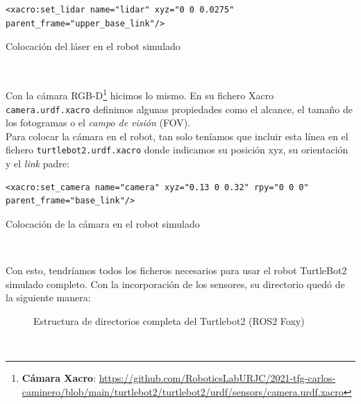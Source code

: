\begin{code}[H]
\begin{lstlisting}
<xacro:set_lidar name="lidar" xyz="0 0 0.0275" parent_frame="upper_base_link"/>
\end{lstlisting}
\caption{Colocación del láser en el robot simulado}
\label{fig:colocacion_laser_simulado}
\end{code}\

Con la cámara RGB-D\footnote{\textbf{Cámara Xacro}: \url{https://github.com/RoboticsLabURJC/2021-tfg-carlos-caminero/blob/main/turtlebot2/turtlebot2/urdf/sensors/camera.urdf.xacro}} hicimos lo mismo. En su fichero Xacro \texttt{camera.urdf.xacro} definimos algunas propiedades como el alcance, el tamaño de los fotogramas o el \textit{campo de visión} (FOV).\\

Para colocar la cámara en el robot, tan solo teníamos que incluir esta línea en el fichero \texttt{turtlebot2.urdf.xacro} donde indicamos su posición xyz, su orientación y el \textit{link} padre:\\

\begin{code}[H]
\begin{lstlisting}
<xacro:set_camera name="camera" xyz="0.13 0 0.32" rpy="0 0 0" parent_frame="base_link"/>
\end{lstlisting}
\caption{Colocación de la cámara en el robot simulado}
\label{fig:colocacion_camara_simulado}
\end{code}\

Con esto, tendríamos todos los ficheros necesarios para usar el robot TurtleBot2 simulado completo. Con la incorporación de los sensores, su directorio quedó de la siguiente manera:

\begin{figure}[H]
	\begin{center}
	    \setlength{\fboxsep}{0.5cm}
	    \caption{Estructura de directorios completa del Turtlebot2 (ROS2 Foxy)}
	    \label{fig:directorios_turtlebot2}
	\end{center}
\end{figure}\

